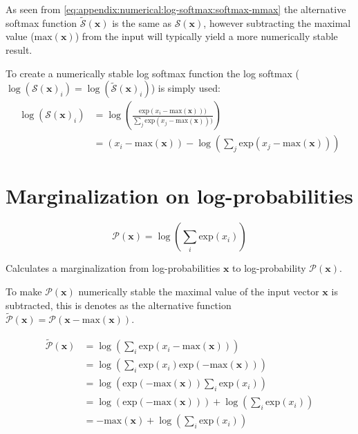 As seen from \eqref{eq:appendix:numerical:log-softmax:softmax-mmax} the alternative softmax function $\tilde{\mathcal{S}}(\mathbf{x})$ is the same as $\mathcal{S}(\mathbf{x})$, however subtracting the maximal value ($\mathrm{max}(\mathbf{x})$) from the input will typically yield a more numerically stable result. 

To create a numerically stable log softmax function the log softmax ($\log(\mathcal{S}(\mathbf{x})_i) = \log(\tilde{\mathcal{S}}(\mathbf{x})_i)$) is simply used:
\begin{equation}
\begin{aligned}
\log(\mathcal{S}(\mathbf{x})_i) 
&= \log\left(\frac{\mathrm{exp}(x_i - \mathrm{max}(\mathbf{x})))}{\sum_j \mathrm{exp}(x_j - \mathrm{max}(\mathbf{x})))}\right) \\
&= (x_i - \mathrm{max}(\mathbf{x})) - \log\left(\sum_j \mathrm{exp}(x_j - \mathrm{max}(\mathbf{x}))\right)
\end{aligned}
\end{equation}

\section{Marginalization on log-probabilities}
\label{appendix:numerical-stability:log-sum-exp}

\begin{equationbox}[H]
\begin{equation*}
\mathcal{P}(\mathbf{x}) = \log\left(\sum_i \mathrm{exp}(x_i)\right)
\end{equation*}
\caption{Calculates a marginalization from log-probabilities $\mathbf{x}$ to log-probability $\mathcal{P}(\mathbf{x})$.}
\end{equationbox}

To make $\mathcal{P}(\mathbf{x})$ numerically stable the maximal value of the input vector $\mathbf{x}$ is subtracted, this is denotes as the alternative function $\tilde{\mathcal{P}}(\mathbf{x}) = \mathcal{P}(\mathbf{x} - \mathrm{max}(\mathbf{x}))$.

\begin{equation}
\begin{aligned}
\tilde{\mathcal{P}}(\mathbf{x}) &= \log\left(\sum_i \mathrm{exp}(x_i - \mathrm{max}(\mathbf{x}))\right) \\
&= \log\left(\sum_i \mathrm{exp}(x_i)\mathrm{exp}(- \mathrm{max}(\mathbf{x}))\right) \\
&= \log\left(\mathrm{exp}(- \mathrm{max}(\mathbf{x})) \sum_i \mathrm{exp}(x_i)\right) \\
&= \log(\mathrm{exp}(- \mathrm{max}(\mathbf{x}))) + \log\left(\sum_i \mathrm{exp}(x_i)\right) \\
&= - \mathrm{max}(\mathbf{x}) + \log\left(\sum_i \mathrm{exp}(x_i)\right)
\end{aligned}
\label{eq:appendix:numerical:log-sum-exp:lsx-mmax}
\end{equation}

